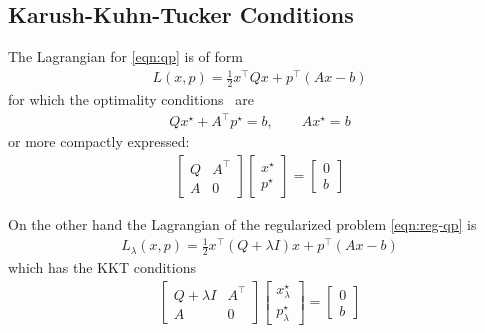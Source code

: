 \documentclass[12pt]{article}
\begin{document}
\subsection{Karush-Kuhn-Tucker Conditions}
The Lagrangian for \eqref{eqn:qp} is of form
\begin{align*}
  L(x, p) = \frac{1}{2} x^\top Q x + p^\top (Ax - b)
\end{align*}
for which the
optimality conditions~\cite{boyd2004convex} are
\begin{align*}
  Q x^\star + A^\top p^\star = b,
    \qquad Ax^\star = b
\end{align*}
or more compactly expressed:
\begin{align}
  \begin{bmatrix} Q & A^\top \\ A & 0 \end{bmatrix}
  \begin{bmatrix} x^\star \\ p^\star \end{bmatrix}
  = \begin{bmatrix} 0 \\ b \end{bmatrix}
    \label{eqn:kkt-qp}
\end{align}

On the other hand the Lagrangian of the
regularized problem \eqref{eqn:reg-qp} is
\begin{align*}
  L_\lambda (x, p) = \frac{1}{2} x^\top (Q + \lambda I) x + p^\top (Ax - b)
\end{align*}
which has the KKT conditions
\begin{align}
  \begin{bmatrix} Q + \lambda I & A^\top \\ A & 0 \end{bmatrix}
  \begin{bmatrix} x_\lambda ^\star \\ p_\lambda ^\star \end{bmatrix}
    = \begin{bmatrix} 0 \\ b \end{bmatrix}
    \label{eqn:kkt-reg-qp}
\end{align}
\end{document}
